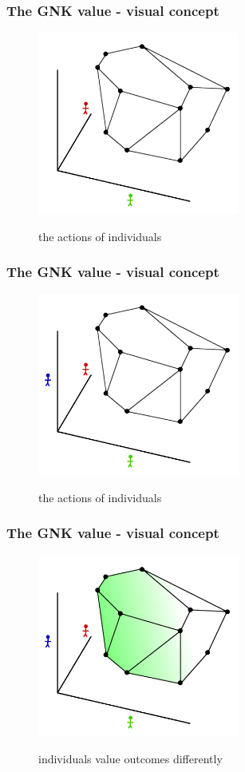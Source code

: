 \documentclass{beamer}
\begin{document}
\begin{frame} \frametitle{The GNK value - visual concept} \begin{figure} \begin{center} \includegraphics[height=6cm]{figs/pp4} \end{center} the actions of individuals \end{figure} \end{frame}
\begin{frame} \frametitle{The GNK value - visual concept} \begin{figure} \begin{center} \includegraphics[height=6cm]{figs/pp5} \end{center} the actions of individuals \end{figure} \end{frame}
\begin{frame} \frametitle{The GNK value - visual concept} \begin{figure} \begin{center} \includegraphics[height=6cm]{figs/pp6} \end{center} individuals value outcomes differently \end{figure} \end{frame}
\end{document}
